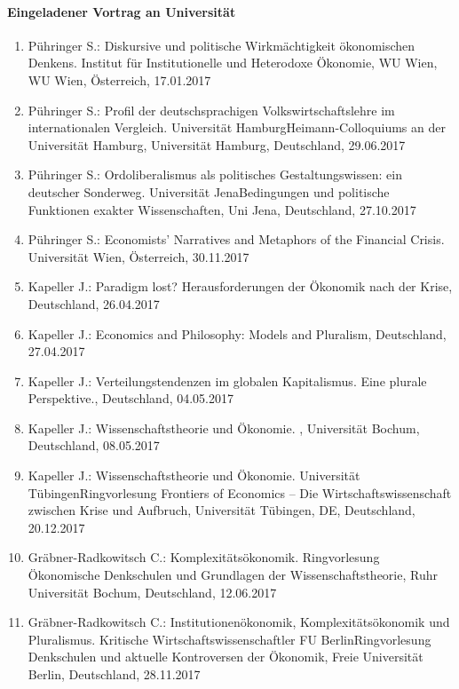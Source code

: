 \paragraph{Eingeladener Vortrag an Universität}
\begin{enumerate}
	\item Pühringer S.: Diskursive und politische Wirkmächtigkeit ökonomischen Denkens. Institut für Institutionelle und Heterodoxe Ökonomie, WU Wien, WU Wien, Österreich, 17.01.2017
	\item Pühringer S.: Profil der deutschsprachigen Volkswirtschaftslehre im internationalen Vergleich. Universität HamburgHeimann-Colloquiums an der Universität Hamburg, Universität Hamburg, Deutschland, 29.06.2017
	\item Pühringer S.: Ordoliberalismus als politisches Gestaltungswissen:  ein deutscher Sonderweg. Universität JenaBedingungen und politische Funktionen exakter Wissenschaften, Uni Jena, Deutschland, 27.10.2017
	\item Pühringer S.: Economists' Narratives and Metaphors of the Financial Crisis. Universität Wien, Österreich, 30.11.2017
	\item Kapeller J.: Paradigm lost? Herausforderungen der Ökonomik nach der Krise, Deutschland, 26.04.2017
	\item Kapeller J.: Economics and Philosophy: Models and Pluralism, Deutschland, 27.04.2017
	\item Kapeller J.: Verteilungstendenzen im globalen Kapitalismus. Eine plurale Perspektive., Deutschland, 04.05.2017
	\item Kapeller J.: Wissenschaftstheorie und Ökonomie. , Universität Bochum, Deutschland, 08.05.2017
	\item Kapeller J.: Wissenschaftstheorie und Ökonomie. Universität TübingenRingvorlesung \glqq Frontiers of Economics – Die Wirtschaftswissenschaft zwischen Krise und Aufbruch\grqq{}, Universität Tübingen, DE, Deutschland, 20.12.2017
	\item Gräbner-Radkowitsch C.: Komplexitätsökonomik. Ringvorlesung \glqq Ökonomische Denkschulen und Grundlagen der Wissenschaftstheorie\grqq{}, Ruhr Universität Bochum, Deutschland, 12.06.2017
	\item Gräbner-Radkowitsch C.: Institutionenökonomik, Komplexitätsökonomik und Pluralismus. Kritische Wirtschaftswissenschaftler FU BerlinRingvorlesung \glqq Denkschulen und aktuelle Kontroversen der Ökonomik\grqq{}, Freie Universität Berlin, Deutschland, 28.11.2017
\end{enumerate}
